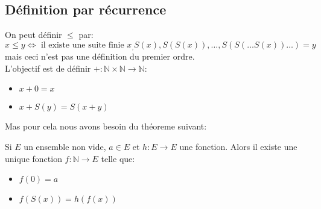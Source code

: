 \subsection{Définition par récurrence}

On peut définir $\leq$ par:
$$ x \leq y \iff \text{ il existe une suite finie } x_, S(x), S(S(x)), \ldots, S(S(\ldots S(x)) \ldots) = y $$
mais ceci n'est pas une définition du premier ordre.\\

L'objectif est de définir $+ : \mathbb{N} \times \mathbb{N} \to \mathbb{N}$:
\begin{itemize}
	\item $x + 0 = x$
	\item $x + S(y) = S(x + y)$
\end{itemize}

Mas pour cela nous avons besoin du théoreme suivant:

\begin{theorem} [Dedekind 1888]
	Si $E$ un ensemble non vide, $a \in E$ et $h : E \to E$ une fonction. Alors il existe une unique fonction $f : \mathbb{N} \to E$ telle que:
	\begin{itemize}
		\item $f(0) = a$
		\item $f(S(x)) = h(f(x))$
	\end{itemize}
\end{theorem}


